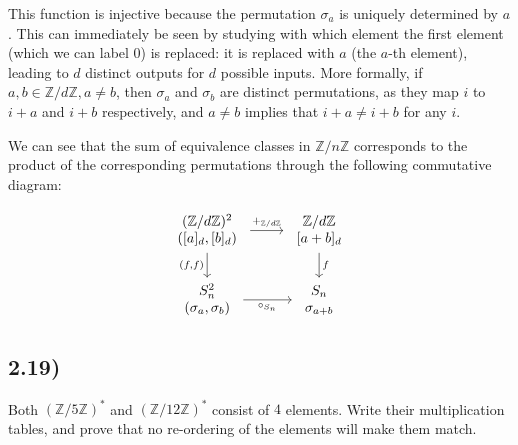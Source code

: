 This function is injective because the permutation $\sigma_a$ is uniquely determined by $a$. This can immediately be seen by studying with which element the first element (which we can label 0) is replaced: it is replaced with $a$ (the $a$-th element), leading to $d$ distinct outputs for $d$ possible inputs. More formally, if $a,b \in \mathbb{Z}/d\mathbb{Z}, a \neq b$, then $\sigma_a$ and $\sigma_b$ are distinct permutations, as they map $i$ to $i + a$ and $i + b$ respectively, and $a \neq b$ implies that $i + a \neq i + b$ for any $i$.

We can see that the sum of equivalence classes in $\mathbb{Z}/n\mathbb{Z}$ corresponds to the product of the corresponding permutations through the following commutative diagram:

$$
\begin{tikzcd}
	\begin{array}{c} (\mathbb{Z}/d\mathbb{Z})^2 \\ ([a]_d, [b]_d) \end{array} & \begin{array}{c} \mathbb{Z}/d\mathbb{Z} \\ {[a+b]_d} \end{array} \\
	\begin{array}{c} S_n^2 \\ (\sigma_a,\sigma_b) \end{array} & \begin{array}{c} S_n \\ \sigma_{a+b} \end{array}
	\arrow["{+_{\mathbb{Z}/d\mathbb{Z}}}", from=1-1, to=1-2]
	\arrow["{(f,f)}"', from=1-1, to=2-1]
	\arrow["f", from=1-2, to=2-2]
	\arrow["{\circ_{S_n}}"', from=2-1, to=2-2]
\end{tikzcd}
$$

\subsection*{2.19)}

Both $(\mathbb{Z}/5\mathbb{Z})^*$ and $(\mathbb{Z}/12\mathbb{Z})^*$ consist of $4$ elements. Write their multiplication tables, and prove that no re-ordering of the elements will make them match.

